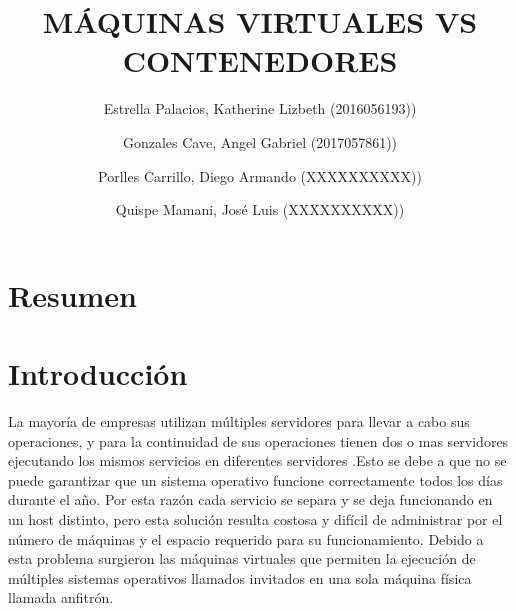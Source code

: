 \documentclass[preprint,12pt]{elsarticle}
\begin{document}
	
	\begin{frontmatter} 

		\title{\huge MÁQUINAS VIRTUALES VS CONTENEDORES}
		
		\author{Estrella Palacios, Katherine Lizbeth              	(2016056193))}
		\author{Gonzales Cave, Angel Gabriel              	        (2017057861))}
		\author{Porlles Carrillo, Diego Armando	         	(XXXXXXXXXX))} %
		\author{Quispe Mamani, José Luis             		(XXXXXXXXXX))} %
		\address{Escuela Profesional de Ingeniería de Sistemas}
		\address{Universidad Privada de Tacna}
		\address{Tacna, Perú}
		

		\begin{abstract}
		


		\end{abstract}


	\end{frontmatter}


\section{Resumen}






\section{Introducción}

La mayoría de empresas utilizan múltiples servidores para llevar a cabo sus operaciones, y para la continuidad de sus operaciones tienen dos o mas servidores ejecutando los mismos servicios en diferentes servidores .Esto se debe a que no se puede garantizar que un sistema operativo funcione correctamente todos los días durante el año. Por esta razón cada servicio se separa y se deja funcionando en un host distinto, pero esta solución resulta costosa y difícil de administrar por el número de máquinas y el espacio requerido para su funcionamiento.
Debido a esta problema surgieron las máquinas virtuales que permiten la ejecución de múltiples sistemas operativos llamados invitados en una sola máquina física llamada anfitrón.  
\end{document}
